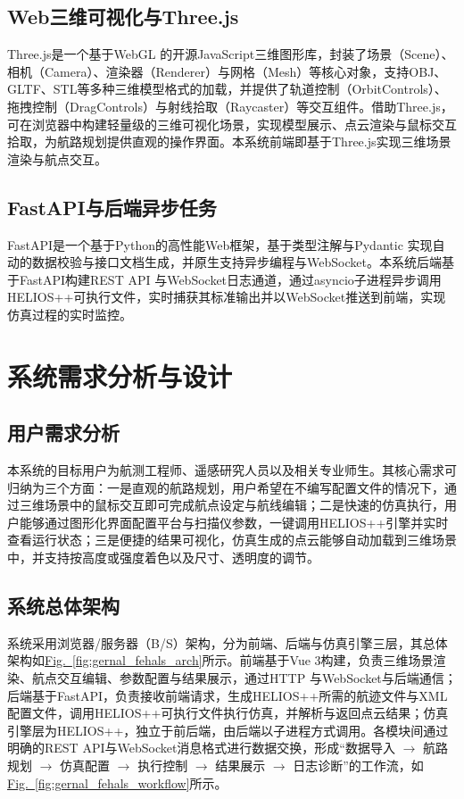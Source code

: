 \documentclass[a4paper,fleqn]{cas-sc}
\newcommand{\refFig}[1]{\hyperref[#1]{Fig.~\ref*{#1}}}
\begin{document}
\subsection{Web三维可视化与Three.js}
Three.js是一个基于WebGL \citep{webgl} 的开源JavaScript三维图形库，封装了场景（Scene）、相机（Camera）、渲染器（Renderer）与网格（Mesh）等核心对象，支持OBJ、GLTF、STL等多种三维模型格式的加载，并提供了轨道控制（OrbitControls）、拖拽控制（DragControls）与射线拾取（Raycaster）等交互组件。借助Three.js，可在浏览器中构建轻量级的三维可视化场景，实现模型展示、点云渲染与鼠标交互拾取，为航路规划提供直观的操作界面。本系统前端即基于Three.js实现三维场景渲染与航点交互。

\subsection{FastAPI与后端异步任务}
FastAPI是一个基于Python的高性能Web框架，基于类型注解与Pydantic \citep{pydantic} 实现自动的数据校验与接口文档生成，并原生支持异步编程与WebSocket。本系统后端基于FastAPI构建REST API \citep{fielding2000rest} 与WebSocket日志通道，通过asyncio子进程异步调用HELIOS++可执行文件，实时捕获其标准输出并以WebSocket推送到前端，实现仿真过程的实时监控。

\section{系统需求分析与设计}\label{sec:design}
\subsection{用户需求分析}
本系统的目标用户为航测工程师、遥感研究人员以及相关专业师生。其核心需求可归纳为三个方面：一是直观的航路规划，用户希望在不编写配置文件的情况下，通过三维场景中的鼠标交互即可完成航点设定与航线编辑；二是快速的仿真执行，用户能够通过图形化界面配置平台与扫描仪参数，一键调用HELIOS++引擎并实时查看运行状态；三是便捷的结果可视化，仿真生成的点云能够自动加载到三维场景中，并支持按高度或强度着色以及尺寸、透明度的调节。

\subsection{系统总体架构}
系统采用浏览器/服务器（B/S）架构，分为前端、后端与仿真引擎三层，其总体架构如\refFig{fig:gernal_fehals_arch}所示。前端基于Vue 3构建，负责三维场景渲染、航点交互编辑、参数配置与结果展示，通过HTTP \citep{rfc9110,rfc9113,rfc9114} 与WebSocket与后端通信；后端基于FastAPI，负责接收前端请求，生成HELIOS++所需的航迹文件与XML配置文件，调用HELIOS++可执行文件执行仿真，并解析与返回点云结果；仿真引擎层为HELIOS++，独立于前后端，由后端以子进程方式调用。各模块间通过明确的REST API与WebSocket消息格式进行数据交换，形成“数据导入 $\rightarrow$ 航路规划 $\rightarrow$ 仿真配置 $\rightarrow$ 执行控制 $\rightarrow$ 结果展示 $\rightarrow$ 日志诊断”的工作流，如\refFig{fig:gernal_fehals_workflow}所示。
\end{document}
